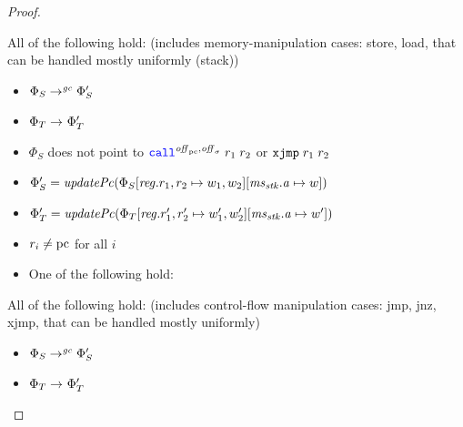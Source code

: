 \begin{proof}
\begin{enumproof}
  \item \label{case:ftlr:store-load-stack} All of the following hold: (includes memory-manipulation cases: store,
    load, that can be handled mostly uniformly (stack))
    \begin{itemize}
    \item $\Phi_S \step[\gc]\Phi_S'$
    \item $\Phi_T \step \Phi_T'$
    \item $\Phi_S$ does not point to $\scall{\offpc,\offsigma}{r_1}{r_2}$ or $\txjmp{r_1}{r_2}$
    \item $\Phi_S' =
      \updPcAddr{\Phi_S\updReg{r_1,r_2}{w_1,w_2}\update{\ms_\stk.\aaddr}{w}}$
    \item $\Phi_T' =
      \updPcAddr{\Phi_T\updReg{r_1',r_2'}{w_1',w_2'}\update{\ms_\stk.\aaddr}{w'}}$
    \item $r_i \neq \pcreg$ for all $i$
    \item One of the following hold:
    \end{itemize}
  \item \label{case:ftlr:store-load-jump} All of the following hold: (includes control-flow manipulation cases:
    jmp, jnz, xjmp, that can be handled mostly uniformly)
    \begin{itemize}
    \item $\Phi_S \step[\gc] \Phi_S'$
    \item $\Phi_T \step \Phi_T'$

\end{itemize}
\end{enumproof}
\end{proof}
